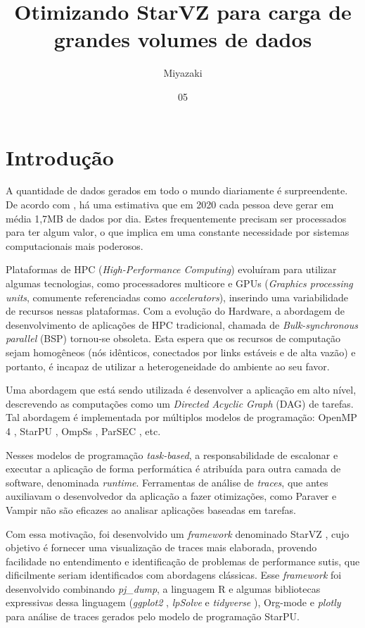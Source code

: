 \documentclass[prop-esp]{iiufrgs}
\title{Otimizando StarVZ para carga de grandes volumes de dados}
\author{Miyazaki}{Alexandre K. S.}
\date{05}{2019}
\begin{document}
\maketitle      



%
\chapter{Introdução} \label{intro}

A quantidade de dados gerados em todo o mundo diariamente é surpreendente. De acordo com \citet{ref:data_minute2}, há uma estimativa
que em 2020 cada pessoa deve gerar em média 1,7MB de dados por dia. Estes frequentemente precisam ser processados para ter algum valor,
o que implica em uma constante necessidade por sistemas computacionais mais poderosos.

Plataformas de HPC (\emph{High-Performance Computing}) evoluíram para utilizar algumas tecnologias, como processadores multicore e GPUs (\emph{Graphics processing units}, comumente referenciadas como \emph{accelerators}), inserindo uma variabilidade de recursos nessas plataformas. Com a evolução do Hardware, a abordagem de desenvolvimento de aplicações de HPC tradicional, chamada de \emph{Bulk-synchronous parallel} (BSP) tornou-se obsoleta. Esta espera que os recursos de computação sejam homogêneos (nós idênticos, conectados por links estáveis e de alta vazão) e portanto, é incapaz de utilizar a heterogeneidade do ambiente ao seu favor. 

Uma abordagem que está sendo utilizada é desenvolver a aplicação em alto nível, descrevendo as computações como um \emph{Directed Acyclic Graph} (DAG) de tarefas. Tal abordagem é implementada por múltiplos modelos de programação: OpenMP 4 \cite{ref:openmp4}, StarPU \cite{ref:starpu}, OmpSs \cite{ref:ompss}, ParSEC \cite{ref:parsec}, etc. 

Nesses modelos de programação \emph{task-based}, a responsabilidade de escalonar e executar a aplicação de forma performática é atribuída para outra camada de software, denominada \emph{runtime}. Ferramentas de análise de \emph{traces}, que antes auxiliavam o desenvolvedor da aplicação a fazer otimizações, como Paraver \cite{ref:paraver} e Vampir \cite{ref:vampir} não são eficazes ao analisar aplicações baseadas em tarefas.

Com essa motivação, foi desenvolvido um \emph{framework} denominado StarVZ \cite{ref:starvz}, cujo objetivo é fornecer uma visualização de traces mais elaborada, provendo facilidade no entendimento e identificação de problemas de performance sutis, que dificilmente seriam identificados com abordagens clássicas. Esse \emph{framework} foi desenvolvido combinando \emph{pj\_dump},  a linguagem R \cite{ref:rlanguage} e algumas bibliotecas expressivas dessa linguagem (\emph{ggplot2} \cite{ref:ggplot2}, \emph{lpSolve} \cite{ref:lpsolve} e \emph{tidyverse} \cite{ref:tidyverse}), Org-mode \cite{ref:org-mode} e \emph{plotly} para análise de traces gerados pelo modelo de programação StarPU.
\end{document}
